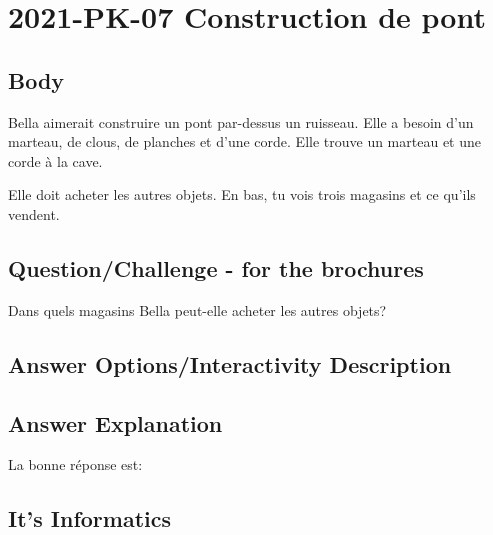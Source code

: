 \documentclass[a4paper,11pt]{report}
\newcommand{\taskGraphicsFolder}{..}
\begin{document}
\section*{\centering{} 2021-PK-07 Construction de pont}


\subsection*{Body}

Bella aimerait construire un pont par-dessus un ruisseau. Elle a besoin d’un marteau, de clous, de planches et d’une corde. Elle trouve un marteau et une corde à la cave.

{\centering%
\par}

Elle doit acheter les autres objets. En bas, tu vois trois magasins et ce qu’ils vendent.

{\em


\subsection*{Question/Challenge - for the brochures}

Dans quels magasins Bella peut-elle acheter les autres objets?

{\centering%
\par}

}

\begingroup
\renewcommand{\arraystretch}{1.5}
\subsection*{Answer Options/Interactivity Description}



\endgroup

\subsection*{Answer Explanation}

La bonne réponse est:

{\centering%
\par}


\subsection*{It’s Informatics}
\end{document}
